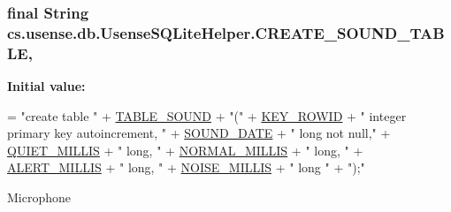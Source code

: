 \subsubsection[{C\+R\+E\+A\+T\+E\+\_\+\+S\+O\+U\+N\+D\+\_\+\+T\+A\+B\+L\+E}]{\setlength{\rightskip}{0pt plus 5cm}final String cs.\+usense.\+db.\+Usense\+S\+Q\+Lite\+Helper.\+C\+R\+E\+A\+T\+E\+\_\+\+S\+O\+U\+N\+D\+\_\+\+T\+A\+B\+L\+E\hspace{0.3cm}{\ttfamily [static]}, {\ttfamily [private]}}\label{classcs_1_1usense_1_1db_1_1_usense_s_q_lite_helper_a6bb8975897d1187d215743a101a9783a}
{\bfseries Initial value\+:}
\begin{DoxyCode}
= \textcolor{stringliteral}{"create table "}
            + \hyperlink{classcs_1_1usense_1_1db_1_1_usense_s_q_lite_helper_abdc4b928a3f27481d62118b39001c7d2}{TABLE\_SOUND} + \textcolor{stringliteral}{"("}
            + \hyperlink{classcs_1_1usense_1_1db_1_1_usense_s_q_lite_helper_a6c668c7ced829f1b1209d9bb67d98687}{KEY\_ROWID} + \textcolor{stringliteral}{" integer primary key autoincrement, "}
            + \hyperlink{classcs_1_1usense_1_1db_1_1_usense_s_q_lite_helper_a6e0ea3be1f3945a94941b7657dce0f49}{SOUND\_DATE} + \textcolor{stringliteral}{" long not null,"}
            + \hyperlink{classcs_1_1usense_1_1db_1_1_usense_s_q_lite_helper_a88e6b2d6e6bf379148ed57a8294b1747}{QUIET\_MILLIS} + \textcolor{stringliteral}{" long, "} 
            + \hyperlink{classcs_1_1usense_1_1db_1_1_usense_s_q_lite_helper_ab5a2cc72b18ae7db2f7a1f877d79681e}{NORMAL\_MILLIS} + \textcolor{stringliteral}{" long, "}
            + \hyperlink{classcs_1_1usense_1_1db_1_1_usense_s_q_lite_helper_a250a30f8124acff4e85ee540bfaf7410}{ALERT\_MILLIS} + \textcolor{stringliteral}{" long, "}
            + \hyperlink{classcs_1_1usense_1_1db_1_1_usense_s_q_lite_helper_a29473a18d1b8cab5d836c1e88125a888}{NOISE\_MILLIS} + \textcolor{stringliteral}{" long "}
            + \textcolor{stringliteral}{");"}
\end{DoxyCode}
Microphone \hypertarget{classcs_1_1usense_1_1db_1_1_usense_s_q_lite_helper_a2b05849e264ee2718aa62fb120efe05d}{}
